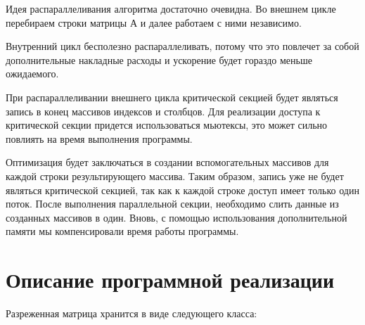 \documentclass{report}
\begin{document}
\par Идея распараллеливания алгоритма достаточно очевидна. Во внешнем цикле перебираем строки матрицы А и далее работаем с ними независимо.
\par Внутренний цикл бесполезно распараллеливать, потому что это повлечет за собой дополнительные накладные расходы и ускорение будет гораздо меньше ожидаемого.
\par При распараллеливании внешнего цикла критической секцией будет являться запись в конец массивов индексов и столбцов. Для реализации доступа к критической секции придется использоваться мьютексы, это может сильно повлиять на время выполнения программы.
\par Оптимизация будет заключаться в создании вспомогательных массивов для каждой строки результирующего массива. Таким образом, запись уже не будет являться критической секцией, так как к каждой строке доступ имеет только один поток.
После выполнения параллельной секции, необходимо слить данные из созданных массивов в один.
Вновь, с помощью использования дополнительной памяти мы компенсировали время работы программы.

\newpage

\section*{Описание программной реализации}
Разреженная матрица хранится в виде следующего класса:
\end{document}
